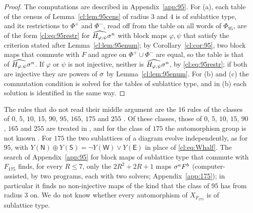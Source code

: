 \begin{proof}
The computations are described in Appendix~\ref{app:95}. For (a), each table of the census of Lemma~\ref{cl:lem:95cens} of radius $3$ and $4$ is of sublattice type, and its restrictions to $\Phi^+$ and $\Phi^-$, read off from the table on all words of $\Phi_{95}$, are of the form \eqref{cl:eq:95restr} for $\widehat{H_{\varphi,\psi}}\sigma^n$ with block maps $\varphi,\psi$ that satisfy the criterion stated after Lemma~\ref{cl:lem:95enum}; by Corollary~\ref{cl:cor:95}, two block maps that commute with $F$ and agree on $\Phi^+\cup\Phi^-$ are equal, so the table is that of $\widehat{H_{\varphi,\psi}}\sigma^n$. If $\varphi$ or $\psi$ is not injective, neither is $\widehat{H_{\varphi,\psi}}\sigma^n$, by \eqref{cl:eq:95restr}; if both are injective they are powers of $\sigma$ by Lemma~\ref{cl:lem:95enum}. For (b) and (c) the commutation condition is solved for the tables of sublattice type, and in (b) each solution is identified in the same way.
\end{proof}

\begin{remark}\label{cl:rem:175}
The rules that do not read their middle argument are the $16$ rules of the classes of $0$, $5$, $10$, $15$, $90$, $95$, $165$, $175$ and $255$ \cite[p.~386]{Takesue1989}. Of these classes, those of $0$, $5$, $10$, $15$, $90$, $165$ and $255$ are treated in \cite{PaperC}, and for the class of $175$ the automorphism group is not known \cite{PaperD}. For $175$ the two sublattices of a diagram evolve independently, as for $95$, with $Y(\mathsf N)\oplus Y(\mathsf S)=\neg Y(\mathsf W)\vee Y(\mathsf E)$ in place of \eqref{cl:eq:Whalf}. The search of Appendix~\ref{app:95} for block maps of sublattice type that commute with $F_{175}$ finds, for every $R\le7$, only the $2R^2+2R+1$ maps $\sigma^aF^b$ (computer-assisted, by two programs, each with two solvers; Appendix~\ref{app:175}); in particular it finds no non-injective maps of the kind that the class of $95$ has from radius $3$ on. We do not know whether every automorphism of $X_{F_{175}}$ is of sublattice type.
\end{remark}
